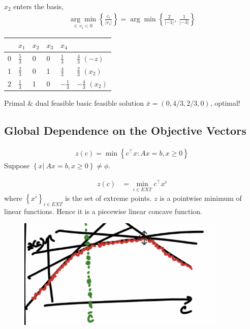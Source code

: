 \documentclass[11pt]{article}
\numberwithin{equation}{section}
\begin{document}
\begin{example}
    $x_2$ enters the basis, \begin{align*}
        \underset{i: \ v_i < 0}{\arg \min} \left\{ \frac{\bar{c}_i}{|v_i|} \right\} = \arg \min \left\{ \frac{2}{|-1|}, \ \frac{1}{|-3|} \right\}
    \end{align*}
    \begin{table}[H]
        \centering
        \begin{tabular}{l|llll|l}
          & $x_1$ & $x_2$ & $x_3$ & $x_4$ &    \\ \hline
        0 & $\frac{5}{3}$     & 0     & 0     & $\frac{1}{3}$     & $\frac{4}{3}$ $\left( -z \right)$  \\ \hline
        1 & $\frac{2}{3}$     & 0     & 1     & $\frac{4}{3}$     & $\frac{2}{3}$ $\left( x_2 \right)$ \\
        2 & $\frac{1}{3}$     & 1    & 0     & $-\frac{1}{3}$     & $-\frac{4}{3}$ $\left( x_2 \right)$
        \end{tabular}
    \end{table}
    Primal \& dual feasible basic feasible solution $\bar{x}=(0,4/3, 2/3, 0)$, optimal!
\end{example}

\subsection{Global Dependence on the Objective Vectors}
\begin{align*}
    z(c) = \min \left\{ c^\top x: A x=b, x \geq 0 \right\}
\end{align*}
Suppose $\left\{ x| \ A x=b, x \geq 0 \right\} \neq \phi$.

\begin{align*}
    z(c) &= \min_{i \in EXT} c^\top x^i
\end{align*}
where $\left\{ x^i \right\}_{i \in EXT}$ is the set of extreme points. $z$ is a pointwise minimum of linear functions. Hence it is a piecewise linear concave function.

\begin{figure}[H]
    \centering
    \includegraphics[width=10cm]{images/7-ex-2.png}
\end{figure}
\end{document}
